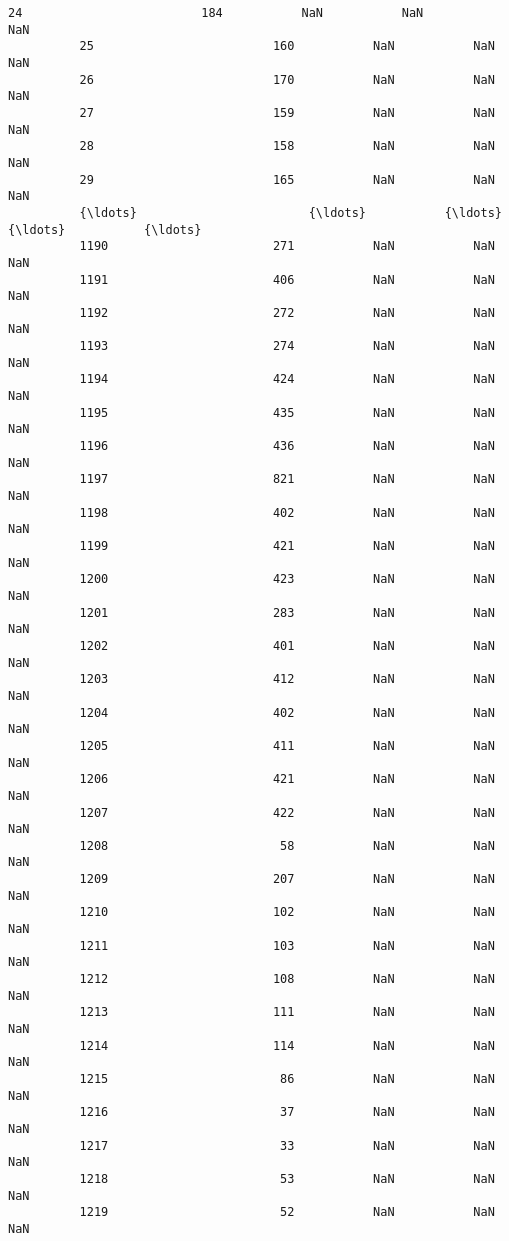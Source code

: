 \documentclass[11pt]{article}
\begin{document}
\begin{Verbatim}[commandchars=\\\{\}]
          24                         184           NaN           NaN           NaN   
          25                         160           NaN           NaN           NaN   
          26                         170           NaN           NaN           NaN   
          27                         159           NaN           NaN           NaN   
          28                         158           NaN           NaN           NaN   
          29                         165           NaN           NaN           NaN   
          {\ldots}                        {\ldots}           {\ldots}           {\ldots}           {\ldots}   
          1190                       271           NaN           NaN           NaN   
          1191                       406           NaN           NaN           NaN   
          1192                       272           NaN           NaN           NaN   
          1193                       274           NaN           NaN           NaN   
          1194                       424           NaN           NaN           NaN   
          1195                       435           NaN           NaN           NaN   
          1196                       436           NaN           NaN           NaN   
          1197                       821           NaN           NaN           NaN   
          1198                       402           NaN           NaN           NaN   
          1199                       421           NaN           NaN           NaN   
          1200                       423           NaN           NaN           NaN   
          1201                       283           NaN           NaN           NaN   
          1202                       401           NaN           NaN           NaN   
          1203                       412           NaN           NaN           NaN   
          1204                       402           NaN           NaN           NaN   
          1205                       411           NaN           NaN           NaN   
          1206                       421           NaN           NaN           NaN   
          1207                       422           NaN           NaN           NaN   
          1208                        58           NaN           NaN           NaN   
          1209                       207           NaN           NaN           NaN   
          1210                       102           NaN           NaN           NaN   
          1211                       103           NaN           NaN           NaN   
          1212                       108           NaN           NaN           NaN   
          1213                       111           NaN           NaN           NaN   
          1214                       114           NaN           NaN           NaN   
          1215                        86           NaN           NaN           NaN   
          1216                        37           NaN           NaN           NaN   
          1217                        33           NaN           NaN           NaN   
          1218                        53           NaN           NaN           NaN   
          1219                        52           NaN           NaN           NaN   
          

\end{Verbatim}
\end{document}
